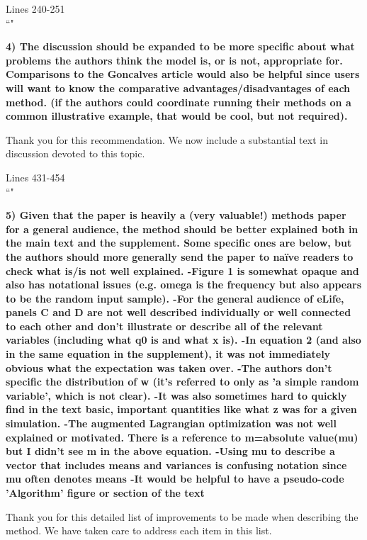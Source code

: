 \documentclass[11pt,a4paper]{article}
\begin{document}
\begin{displayquote}
Lines 240-251\\
``"
\end{displayquote}

\textbf{4) The discussion should be expanded to be more specific about what problems the authors think the model is, or is not, appropriate for. Comparisons to the Goncalves article would also be helpful since users will want to know the comparative advantages/disadvantages of each method. (if the authors could coordinate running their methods on a common illustrative example, that would be cool, but not required). }

Thank you for this recommendation.
We now include a substantial text in discussion devoted to this topic.

\begin{displayquote}
Lines 431-454\\
``"
\end{displayquote}

\textbf{5) Given that the paper is heavily a (very valuable!) methods paper for a general audience, the method should be better explained both in the main text and the supplement. Some specific ones are below, but the authors should more generally send the paper to naïve readers to check what is/is not well explained. 
-Figure 1 is somewhat opaque and also has notational issues (e.g. omega is the frequency but also appears to be the random input sample). 
-For the general audience of eLife, panels C and D are not well described individually or well connected to each other and don't illustrate or describe all of the relevant variables (including what q0 is and what x is). 
-In equation 2 (and also in the same equation in the supplement), it was not immediately obvious what the expectation was taken over. 
-The authors don't specific the distribution of w (it's referred to only as 'a simple random variable', which is not clear). 
-It was also sometimes hard to quickly find in the text basic, important quantities like what z was for a given simulation. 
-The augmented Lagrangian optimization was not well explained or motivated. There is a reference to m=absolute value(mu) but I didn't see m in the above equation. 
-Using mu to describe a vector that includes means and variances is confusing notation since mu often denotes means 
-It would be helpful to have a pseudo-code 'Algorithm' figure or section of the text }

Thank you for this detailed list of improvements to be made when describing the method.
We have taken care to address each item in this list.
\end{document}
